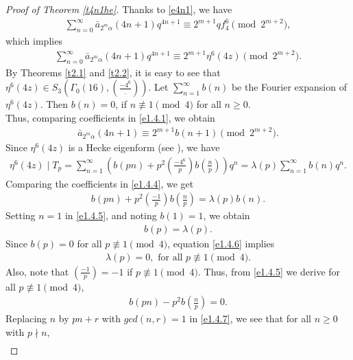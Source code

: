 \documentclass[11pt,a4paper]{article}
\numberwithin{equation}{section}
\theoremstyle{plain}
\begin{document}
\begin{proof}[Proof of Theorem \ref{t4n1he}\unskip]
Thanks to \eqref{e4n1}, we have
\begin{align*}
\sum_{n=0}^{\infty}\bar{a}_{2^m\alpha}(4n+1)q^{4n+1}\equiv 2^{m+1}q f_4^6\pmod{2^{m+2}},
\end{align*}
which implies
\begin{align}\label{e1.4.1}
\sum_{n=0}^{\infty}\bar{a}_{2^m\alpha}(4n+1)q^{4n+1}\equiv 2^{m+1}\eta^6(4z)\pmod{2^{m+2}}.
\end{align}
By Theorems \ref{t2.1} and \ref{t2.2}, it is easy to see that $\eta^6(4z)\in S_3\left(\Gamma_0(16), \left(\frac{-4^6}{.}\right)\right)$. Let $\sum_{n=1}^{\infty}b(n)$ be the Fourier expansion of  $\eta^6(4z)$. Then $b(n)=0$, if $n\not\equiv 1\pmod 4$ for all $n\ge 0$.\\ Thus, comparing coefficients in \eqref{e1.4.1}, we obtain
\begin{align}\label{e1.4.3}
\bar{a}_{2^m\alpha}(4n+1)\equiv 2^{m+1}b(n+1)\pmod{2^{m+2}}.
\end{align}
Since  $\eta^6(4z)$ is a Hecke eigenform (see \cite{martin}), we have
\begin{align}\label{e1.4.4}
\eta^6(4z)\mid T_p=\sum_{n=1}^{\infty}\left(b(pn)+p^2\left(\frac{-4^6}{p}\right)b\left(\frac{n}{p}\right)\right)q^n=\lambda(p)\sum_{n=1}^{\infty}b(n)q^n.
\end{align}
Comparing the coefficients in \eqref{e1.4.4}, we get
\begin{align}\label{e1.4.5}
b(pn)+p^2\left(\frac{-1}{p}\right)b\left(\frac{n}{p}\right)=\lambda(p)b(n).
\end{align}
 Setting $n=1$ in \eqref{e1.4.5}, and noting $b(1)=1$, we obtain
\begin{align}\label{e1.4.6}
b(p)=\lambda(p).
\end{align}
Since $b(p)=0$ for all $p\not\equiv 1\pmod 4$, equation \eqref{e1.4.6} implies
\begin{align*}
\lambda(p)=0, \text{ for all } p\not\equiv 1\pmod 4.	
\end{align*}
Also, note that $\left(\frac{-1}{p}\right)=-1$ if $p\not\equiv 1\pmod 4$. Thus, from \eqref{e1.4.5} we derive for all $p\not\equiv 1\pmod 4$,
\begin{align}\label{e1.4.7}
b(pn)-p^2b\left(\frac{n}{p}\right)=0.
\end{align}
Replacing $n$ by $pn+r$ with $gcd(n,r)=1$ in \eqref{e1.4.7}, we see that for all $n\ge 0$ with $p\nmid n$,
\begin{align}\label{e1.4.8}

\end{align}
\end{proof}
\end{document}

